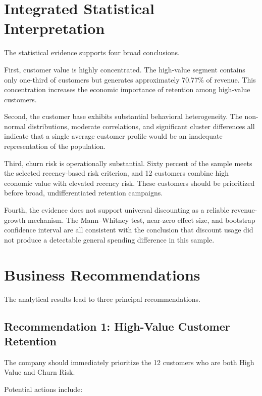 \documentclass[11pt,a4paper]{article}
\begin{document}

\section{Integrated Statistical Interpretation}

The statistical evidence supports four broad conclusions.

First, customer value is highly concentrated. The high-value segment
contains only one-third of customers but generates approximately 70.77\%
of revenue. This concentration increases the economic importance of
retention among high-value customers.

Second, the customer base exhibits substantial behavioral heterogeneity.
The non-normal distributions, moderate correlations, and significant
cluster differences all indicate that a single average customer profile
would be an inadequate representation of the population.

Third, churn risk is operationally substantial. Sixty percent of the
sample meets the selected recency-based risk criterion, and 12 customers
combine high economic value with elevated recency risk. These customers
should be prioritized before broad, undifferentiated retention campaigns.

Fourth, the evidence does not support universal discounting as a reliable
revenue-growth mechanism. The Mann--Whitney test, near-zero effect size,
and bootstrap confidence interval are all consistent with the conclusion
that discount usage did not produce a detectable general spending
difference in this sample.


\section{Business Recommendations}

The analytical results lead to three principal recommendations.

\subsection{Recommendation 1: High-Value Customer Retention}

The company should immediately prioritize the 12 customers who are both High Value and Churn Risk.

Potential actions include:
\end{document}
